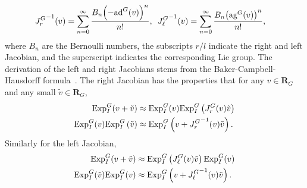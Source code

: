 \begin{align*}
{J_r^{G}}^{-1}(v) & =\sum_{n=0}^{\infty}\frac{B_{n}\mathopen{}\left(-\text{ad}^G(v)\right)^{n}\mathclose{}}{n!},  \hspace{0.5em} {J_\ell^{G}}^{-1}(v)=\sum_{n=0}^{\infty}\frac{B_{n}\mathopen{}\left(\text{ag}^G(v)\right)^{n}\mathclose{}}{n!},
\end{align*}
where $B_{n}$ are the Bernoulli numbers, the subscripts $r/l$ indicate the right and left Jacobian, and the superscript indicates the corresponding Lie group. The derivation of the left
and right Jacobians stems from the Baker-Campbell-Hausdorff formula~\cite{Hall2003,Barfoot2019}. The
right Jacobian has the properties that for any $v\in\mathbf{R}_G$ and any small $\tilde{v}\in\mathbf{R}_G$, 
\begin{subequations}\label{eq:Jr_property}
\begin{align}
\text{Exp}_I^{G}(v + \tilde{v}) & \approx\text{Exp}_I^{G}(v)\text{Exp}_I^{G}\left(J_r^G(v)\tilde{v}\right)\\
\text{Exp}_I^{G}(v)\text{Exp}_I^{G}\left(\tilde{v}\right) & \approx\text{Exp}_I^{G}\left(v+{J_r^{G}}^{-1}(v)\tilde{v}\right).
\end{align}
\end{subequations}
%
Similarly for the left Jacobian,
\begin{align*}
\text{Exp}_I^{G}(v+\tilde{v}) & \approx\text{Exp}_I^{G}\left(J_\ell^{G}(v)\tilde{v}\right)\text{Exp}_I^{G}(v)\\
\text{Exp}_I^{G}(\tilde{v})\text{Exp}_I^{G}(v) & \approx\text{Exp}_I^{G}\left(v+{J_\ell^G}^{-1}(v)\tilde{v}\right).
\end{align*}

